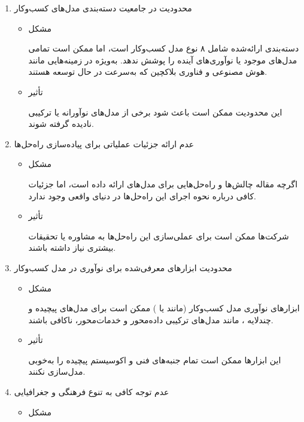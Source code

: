 \documentclass[10pt, twocolumn]{article}
\begin{document}
\begin{enumerate}
\item 
محدودیت در جامعیت دسته‌بندی مدل‌های کسب‌وکار 

\begin{itemize}
\item 
مشکل

دسته‌بندی ارائه‌شده شامل ۸ نوع مدل کسب‌وکار است، اما ممکن است تمامی مدل‌های موجود یا نوآوری‌های آینده را پوشش ندهد. به‌ویژه در زمینه‌هایی مانند هوش مصنوعی  و فناوری بلاکچین که به‌سرعت در حال توسعه هستند.  
\item 
تأثیر

این محدودیت ممکن است باعث شود برخی از مدل‌های نوآورانه یا ترکیبی نادیده گرفته شوند.  
\end{itemize} 

\item 
عدم ارائه جزئیات عملیاتی برای پیاده‌سازی راه‌حل‌ها  

\begin{itemize}
\item 
مشکل

اگرچه مقاله چالش‌ها و راه‌حل‌هایی برای مدل‌های  ارائه داده است، اما جزئیات کافی درباره نحوه اجرای این راه‌حل‌ها در دنیای واقعی وجود ندارد.  
\item 
تأثیر

شرکت‌ها ممکن است برای عملی‌سازی این راه‌حل‌ها به مشاوره یا تحقیقات بیشتری نیاز داشته باشند.  
\end{itemize}

\item 
محدودیت ابزارهای معرفی‌شده برای نوآوری در مدل کسب‌وکار  

\begin{itemize}
\item 
مشکل

ابزارهای نوآوری مدل کسب‌وکار (مانند  یا ) ممکن است برای مدل‌های پیچیده و چندلایه ، مانند مدل‌های ترکیبی داده‌محور و خدمات‌محور، ناکافی باشند.  
\item 
تأثیر

این ابزارها ممکن است تمام جنبه‌های فنی و اکوسیستم پیچیده  را به‌خوبی مدل‌سازی نکنند.  
\end{itemize}

\item 
عدم توجه کافی به تنوع فرهنگی و جغرافیایی  

\begin{itemize}
\item 
مشکل


\end{itemize}
\end{enumerate}
\end{document}
